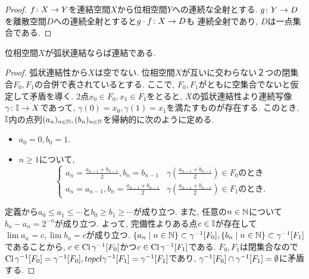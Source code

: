 \documentclass[uplatex, dvipdfmx, a4paper, 12pt, class=jsbook, crop=false]{standalone}
\begin{document}
\begin{proof}
	$ f\colon X\to Y $を連結空間$ X $から位相空間$ Y $への連続な全射とする.
	$ g\colon Y\to D $を離散空間$ D $への連続全射とすると$ g \cdot f\colon X\to D $も
	連続全射であり, $ D $は一点集合である.
\end{proof}

\begin{proposition}
	\label{prop:PathCtd>Ctd}
	位相空間$ X $が弧状連結ならば連結である.
\end{proposition}

\begin{proof}
	弧状連結性から$ X $は空でない.
	位相空間$ X $が互いに交わらない２つの閉集合$ F_0, F_1 $の合併で表されているとする.
	ここで, $ F_0, F_1 $がともに空集合でないと仮定して矛盾を導く.
	2点$ x_0 \in F_0, x_1 \in F_1 $をとると, $ X $の弧状連結性より連続写像$ \gamma\colon\mathbb{I}\to X $であって,
	$ \gamma(0) = x_0, \gamma(1) = x_1 $を満たすものが存在する.
	このとき, $ \mathbb{I} $内の点列$ (a_n)_{n\in \mathbb{N}}, (b_n)_{n \in \mathbb{N}} $を帰納的に次のように定める.
	\begin{itemize}
		\item $ a_0 = 0, b_0 = 1 $.
		\item $ n \geq 1 $について,
		\begin{equation}
			\begin{cases}
				a_n = \frac{a_{n-1} + b_{n-1}}{2}, b_n = b_{n-1} & \gamma\left(\frac{a_{n-1} + b_{n-1}}{2}\right) \in F_0 \text{のとき} \\
				a_n = a_{n-1}, b_n = \frac{a_{n-1} + b_{n-1}}{2} & \gamma\left(\frac{a_{n-1} + b_{n-1}}{2}\right) \in F_1 \text{のとき} .
			\end{cases}
		\end{equation}
	\end{itemize}
	定義から$ a_0 \leq a_1 \leq \cdots $と$ b_0 \geq b_1 \geq \cdots $が成り立つ.
	また, 任意の$ n \in \mathbb{N} $について$ b_n - a_n = 2^{-n} $が成り立つ.
	よって, 完備性よりある点$ c \in \mathbb{I} $が存在して$ \lim a_n = c, \lim b_n = c $が成り立つ.
	$ \setcomp{a_n}{n \in \N} \subset \mapinvset{\gamma}{F_0}, \setcomp{b_n}{n \in \N} \subset \mapinvset{\gamma}{F_1}$であることから,
	$ c \in \topcl{\mapinvset{\gamma}{F_0}} $かつ$ c \in \topcl{\mapinvset{\gamma}{F_1}} $である.
	$ F_0, F_1 $は閉集合なので$\topcl{\mapinvset{\gamma}{F_0}} = \mapinvset{\gamma}{F_0}, topcl{\mapinvset{\gamma}{F_1}} = \mapinvset{\gamma}{F_1} $であり,
	$ \mapinvset{\gamma}{F_0} \cap \mapinvset{\gamma}{F_1} = \emptyset $に矛盾する.
\end{proof}
\end{document}
